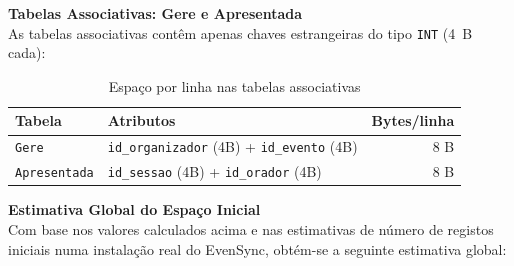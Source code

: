 \documentclass[runningheads]{llncs}
\begin{document}
                \vspace{0.4cm}
                \noindent\begin{minipage}{\textwidth}
                \noindent\textbf{Tabelas Associativas: Gere e Apresentada}\\[0.2cm]

                As tabelas associativas contêm apenas chaves estrangeiras do tipo \texttt{INT} (4~B cada):

                \begin{table}[H]
                \centering
                \renewcommand{\arraystretch}{1.3}
                \begin{tabular}{|l|l|r|}
                \hline
                \textbf{Tabela} & \textbf{Atributos} & \textbf{Bytes/linha} \\ \hline
                \texttt{Gere}        & \texttt{id\_organizador} (4B) + \texttt{id\_evento} (4B)  & 8 B \\ \hline
                \texttt{Apresentada} & \texttt{id\_sessao} (4B) + \texttt{id\_orador} (4B)       & 8 B \\ \hline
                \end{tabular}
                \vspace{0.2cm}
                \caption{Espaço por linha nas tabelas associativas} \label{tab:bytes_assoc}
                \end{table}
                \end{minipage}

                \vspace{0.4cm}
                \noindent\textbf{Estimativa Global do Espaço Inicial}\\[0.2cm]

                Com base nos valores calculados acima e nas estimativas de número de registos
                iniciais numa instalação real do EvenSync, obtém-se a seguinte estimativa global:
\end{document}
